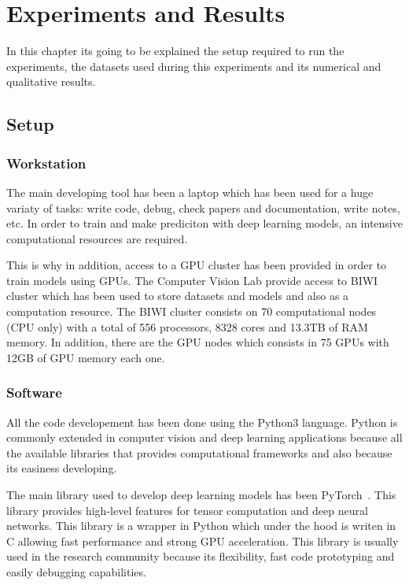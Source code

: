
\chapter{Experiments and Results}
\label{cha:experimentsandresults}

In this chapter its going to be explained the setup required to run the experiments,
the datasets used during this experiments and its numerical and qualitative results.

\section{Setup}
\subsection{Workstation}

The main developing tool has been a laptop which has been used for a huge variaty of tasks: write code, debug, check papers and documentation, write notes, etc.
In order to train and make prediciton with deep learning models, an intensive computational resources are required.

This is why in addition, access to a GPU cluster has been provided in order to train models using GPUs.
The Computer Vision Lab provide access to BIWI cluster which has been used to store datasets and models and also as a computation resource. The BIWI cluster consists on 70 computational nodes (CPU only) with a total of 556 processors, 8328 cores and 13.3TB of RAM memory.
In addition, there are the GPU nodes which consists in 75 GPUs with 12GB of GPU memory each one.

\subsection{Software}

All the code developement has been done using the Python3 language.
Python is commonly extended in computer vision and deep learning applications because all the available libraries that provides computational frameworks and also because its easiness developing.

The main library used to develop deep learning models has been PyTorch~\pytorch. This library provides high-level features for tensor computation and deep neural networks.
This library is a wrapper in Python which under the hood is writen in C allowing fast performance and strong GPU acceleration.
This library is usually used in the research community because its flexibility, fast code prototyping and easily debugging capabilities.

